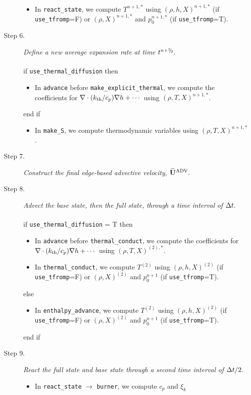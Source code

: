 \begin{description}
\begin{itemize}
\item In {\tt react\_state}, we compute $T^{n+1,*}$ using $(\rho,h,X)^{n+1,*}$ 
(if {\tt use\_tfromp}=F) or $(\rho,X)^{n+1,*}$ and $p_0^{n+1,*}$ (if {\tt use\_tfromp}=T).
\end{itemize}
\item[Step 6.] {\em Define a new average expansion rate at time $t^\nph.$}\\ \\
if {\tt use\_thermal\_diffusion} then
\begin{itemize}
\item In {\tt advance} before {\tt make\_explicit\_thermal}, we compute the coefficients for 
$\nabla\cdot(k_{\rm th}/c_p)\nabla h + \cdots$ using $(\rho,T,X)^{n+1,*}$.
\end{itemize}
end if
\begin{itemize}
\item In {\tt make\_S}, we compute thermodynamic variables using $(\rho,T,X)^{n+1,*}$.
\end{itemize}
\item[Step 7.] {\em Construct the final edge-based advective velocity, $\widetilde{\mathbf{U}}^{\mathrm{ADV}}.$}
\item[Step 8.] {\em Advect the base state, then the full state, through a time interval 
of $\Delta t.$}\\ \\
if {\tt use\_thermal\_diffusion} = T then
\begin{itemize}
\item In {\tt advance} before {\tt thermal\_conduct}, we compute the coefficients for 
$\nabla\cdot(k_{\rm th}/c_p)\nabla h + \cdots$ using $(\rho,T,X)^{(2),*}$.
\item In {\tt thermal\_conduct}, we compute $T^{(2)}$ using $(\rho,h,X)^{(2)}$
(if {\tt use\_tfromp}=F) or $(\rho,X)^{(2)}$ and $p_0^{n+1}$ (if {\tt use\_tfromp}=T).
\end{itemize}
else
\begin{itemize}
\item In {\tt enthalpy\_advance}, we compute $T^{(2)}$ using $(\rho,h,X)^{(2)}$
(if {\tt use\_tfromp}=F) or $(\rho,X)^{(2)}$ and $p_0^{n+1}$ (if {\tt use\_tfromp}=T).
\end{itemize}
end if
\item[Step 9.] {\em React the full state and base state through a second time interval 
of $\Delta t/2.$}
\begin{itemize}
\item In {\tt react\_state} $\rightarrow$ {\tt burner}, we compute $c_p$ and $\xi_k$ 

\end{itemize}
\end{description}
